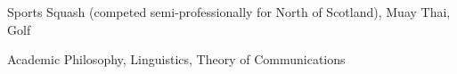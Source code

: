 

\begin{cvskills}

  \cvskill
    {Sports} %
    {Squash (competed semi-professionally for North of Scotland), Muay Thai, Golf} %

  \cvskill
    {Academic} %
    {Philosophy, Linguistics, Theory of Communications} %

\end{cvskills}
